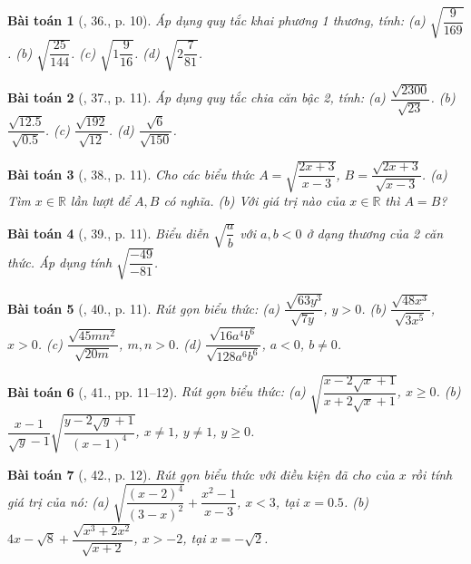 \documentclass{article}
\newtheorem{baitoan}{Bài toán}
\begin{document}
\begin{baitoan}[\cite{SBT_Toan_9_tap_1}, 36., p. 10]
	Áp dụng quy tắc khai phương 1 thương, tính: (a) $\sqrt{\dfrac{9}{169}}$. (b) $\sqrt{\dfrac{25}{144}}$. (c) $\sqrt{1\dfrac{9}{16}}$. (d) $\sqrt{2\dfrac{7}{81}}$.
\end{baitoan}

\begin{baitoan}[\cite{SBT_Toan_9_tap_1}, 37., p. 11]
	Áp dụng quy tắc chia căn bậc 2, tính: (a) $\dfrac{\sqrt{2300}}{\sqrt{23}}$. (b) $\dfrac{\sqrt{12.5}}{\sqrt{0.5}}$. (c) $\dfrac{\sqrt{192}}{\sqrt{12}}$. (d) $\dfrac{\sqrt{6}}{\sqrt{150}}$.
\end{baitoan}

\begin{baitoan}[\cite{SBT_Toan_9_tap_1}, 38., p. 11]
	Cho các biểu thức $A = \sqrt{\dfrac{2x + 3}{x - 3}}$, $B = \dfrac{\sqrt{2x + 3}}{\sqrt{x - 3}}$. (a) Tìm $x\in\mathbb{R}$ lần lượt để $A,B$ có nghĩa. (b) Với giá trị nào của $x\in\mathbb{R}$ thì $A = B$?
\end{baitoan}

\begin{baitoan}[\cite{SBT_Toan_9_tap_1}, 39., p. 11]
	Biểu diễn $\sqrt{\dfrac{a}{b}}$ với $a,b < 0$ ở dạng thương của 2 căn thức. Áp dụng tính $\sqrt{\dfrac{-49}{-81}}$.
\end{baitoan}

\begin{baitoan}[\cite{SBT_Toan_9_tap_1}, 40., p. 11]
	Rút gọn biểu thức: (a) $\dfrac{\sqrt{63y^3}}{\sqrt{7y}}$, $y > 0$. (b) $\dfrac{\sqrt{48x^3}}{\sqrt{3x^5}}$, $x > 0$. (c) $\dfrac{\sqrt{45mn^2}}{\sqrt{20m}}$, $m,n > 0$. (d) $\dfrac{\sqrt{16a^4b^6}}{\sqrt{128a^6b^6}}$, $a < 0$, $b\ne0$.
\end{baitoan}

\begin{baitoan}[\cite{SBT_Toan_9_tap_1}, 41., pp. 11--12]
	Rút gọn biểu thức: (a) $\sqrt{\dfrac{x - 2\sqrt{x} + 1}{x + 2\sqrt{x} + 1}}$, $x\ge0$. (b) $\dfrac{x - 1}{\sqrt{y} - 1}\sqrt{\dfrac{y - 2\sqrt{y} + 1}{(x - 1)^4}}$, $x\ne1$, $y\ne1$, $y\ge0$.
\end{baitoan}

\begin{baitoan}[\cite{SBT_Toan_9_tap_1}, 42., p. 12]
	Rút gọn biểu thức với điều kiện đã cho của $x$ rồi tính giá trị của nó: (a) $\sqrt{\dfrac{(x - 2)^4}{(3 - x)^2}} + \dfrac{x^2 - 1}{x - 3}$, $x < 3$, tại $x = 0.5$. (b) $4x - \sqrt{8} + \dfrac{\sqrt{x^3 + 2x^2}}{\sqrt{x + 2}}$, $x > -2$, tại $x = -\sqrt{2}$.
\end{baitoan}
\end{document}
